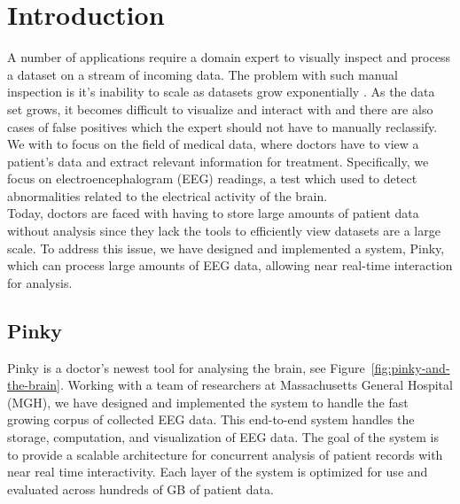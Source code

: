 \chapter{Introduction}\label{intro-ch}

A number of applications require a domain expert to visually inspect and
process a dataset on a stream of incoming data. The problem with such manual
inspection is it's inability to scale as datasets grow exponentially
\cite{exp-growth}. As the data set grows, it becomes difficult to visualize and
interact with \cite{immens} and there are also cases of false positives which
the expert should not have to manually reclassify. We with to focus on the
field of medical data, where doctors have to view a patient's data and extract
relevant information for treatment. Specifically, we focus on
electroencephalogram (EEG) readings, a test which used to detect abnormalities
related to the electrical activity of the brain. \\

Today, doctors are faced with having to store large amounts of patient data
without analysis since they lack the tools to efficiently view datasets are a
large scale. To address this issue, we have designed and implemented a system,
Pinky, which can process large amounts of EEG data, allowing near real-time
interaction for analysis.


\section{Pinky}

Pinky is a doctor's newest tool for analysing the brain, see
Figure~\ref{fig:pinky-and-the-brain}. Working with a team of researchers at
Massachusetts General Hospital (MGH), we have designed and implemented the
system to handle the fast growing corpus of collected EEG data. This end-to-end
system handles the storage, computation, and visualization of EEG data. The
goal of the system is to provide a scalable architecture for concurrent
analysis of patient records with near real time interactivity. Each layer of
the system is optimized for use and evaluated across hundreds of GB of patient
data. \\

